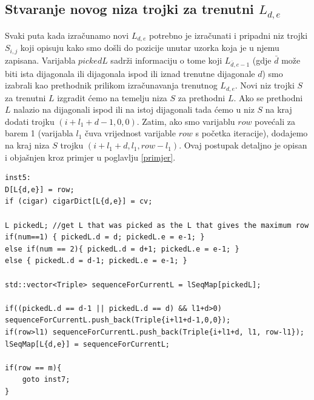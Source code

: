 \documentclass[times, utf8, zavrsni]{fer}
\begin{document}
\subsection{Stvaranje novog niza trojki za trenutni $L_{d,e}$}
Svaki puta kada izračunamo novi $L_{d,e}$ potrebno je izračunati i pripadni niz trojki $S_{i,j}$ koji opisuju kako smo došli do pozicije unutar uzorka koja je u njemu zapisana. Varijabla $pickedL$ sadrži informaciju o tome koji $L_{\bar{d},e-1}$ (gdje $\bar{d}$ može biti ista dijagonala ili dijagonala ispod ili iznad trenutne dijagonale $d$) smo izabrali kao prethodnik prilikom izračunavanja trenutnog $L_{d,e}$. Novi niz trojki $S$ za trenutni $L$ izgradit ćemo na temelju niza $S$ za prethodni $L$. Ako se prethodni $L$ nalazio na dijagonali ispod ili na istoj dijagonali tada ćemo u niz $S$ na kraj dodati trojku $(i+l_1+d-1,0,0)$. Zatim, ako smo varijablu $row$ povećali za barem 1 (varijabla $l_1$ čuva vrijednost varijable $row$ s početka iteracije), dodajemo na kraj niza $S$ trojku $(i+l_1+d, l_1, row-l_1)$. Ovaj postupak detaljno je opisan i objašnjen kroz primjer u poglavlju \ref{primjer}.
\newline
\begin{lstlisting}
inst5:
D[L{d,e}] = row;
if (cigar) cigarDict[L{d,e}] = cv;

L pickedL; //get L that was picked as the L that gives the maximum row
if(num==1) { pickedL.d = d; pickedL.e = e-1; }
else if(num == 2){ pickedL.d = d+1; pickedL.e = e-1; }
else { pickedL.d = d-1; pickedL.e = e-1; }

std::vector<Triple> sequenceForCurrentL = lSeqMap[pickedL];

if((pickedL.d == d-1 || pickedL.d == d) && l1+d>0) sequenceForCurrentL.push_back(Triple{i+l1+d-1,0,0});
if(row>l1) sequenceForCurrentL.push_back(Triple{i+l1+d, l1, row-l1});
lSeqMap[L{d,e}] = sequenceForCurrentL;

if(row == m){
    goto inst7;
}
\end{lstlisting}
\end{document}
